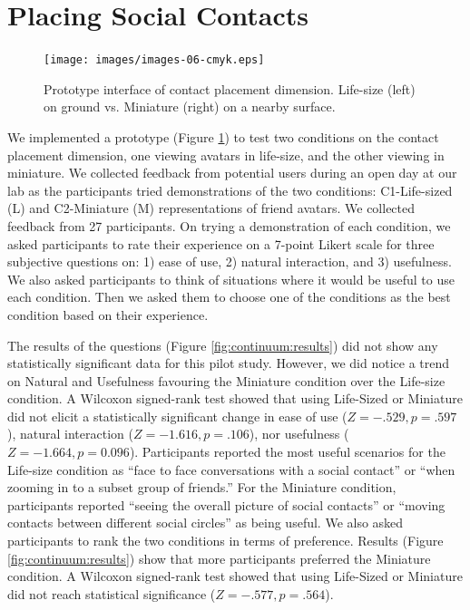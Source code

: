 
\section{Placing Social Contacts}

\begin{figure}
    \centering
    \texttt{[image: images/images-06-cmyk.eps]}
    \caption{Prototype interface of contact placement dimension. Life-size (left) on ground vs. Miniature (right) on a nearby surface.} 
    \label{fig:continuum:conditions}
\end{figure}

We implemented a prototype (Figure \ref{fig:continuum:conditions}) to test two conditions on the contact placement dimension, one viewing avatars in life-size, and the other viewing in miniature. 
We collected feedback from potential users during an open day at our lab as the participants tried demonstrations of the two conditions: C1-Life-sized (L) and C2-Miniature (M) representations of friend avatars. We collected feedback from 27 participants. On trying a demonstration of each condition, we asked participants to rate their experience on a 7-point Likert scale for three subjective questions on: 1) ease of use, 2) natural interaction, and 3) usefulness. We also asked participants to think of situations where it would be useful to use each condition. Then we asked them to choose one of the conditions as the best condition based on their experience. 

The results of the questions (Figure \ref{fig:continuum:results}) did not show any statistically significant data for this pilot study. However, we did notice a trend on Natural and Usefulness favouring the Miniature condition over the Life-size condition. A Wilcoxon signed-rank test showed that using Life-Sized or Miniature did not elicit a statistically significant change in ease of use ($Z=-.529, p=.597$), natural interaction ($Z=-1.616, p=.106$), nor usefulness ($Z=-1.664, p=0.096$). Participants reported the most useful scenarios for the Life-size condition as \enquote{face to face conversations with a social contact} or \enquote{when zooming in to a subset group of friends.} For the Miniature condition, participants reported \enquote{seeing the overall picture of social contacts} or \enquote{moving contacts between different social circles} as being useful. We also asked participants to rank the two conditions in terms of preference. Results (Figure \ref{fig:continuum:results}) show that more participants preferred the Miniature condition. A Wilcoxon signed-rank test showed that using Life-Sized or Miniature did not reach statistical significance ($Z=-.577, p=.564$).

